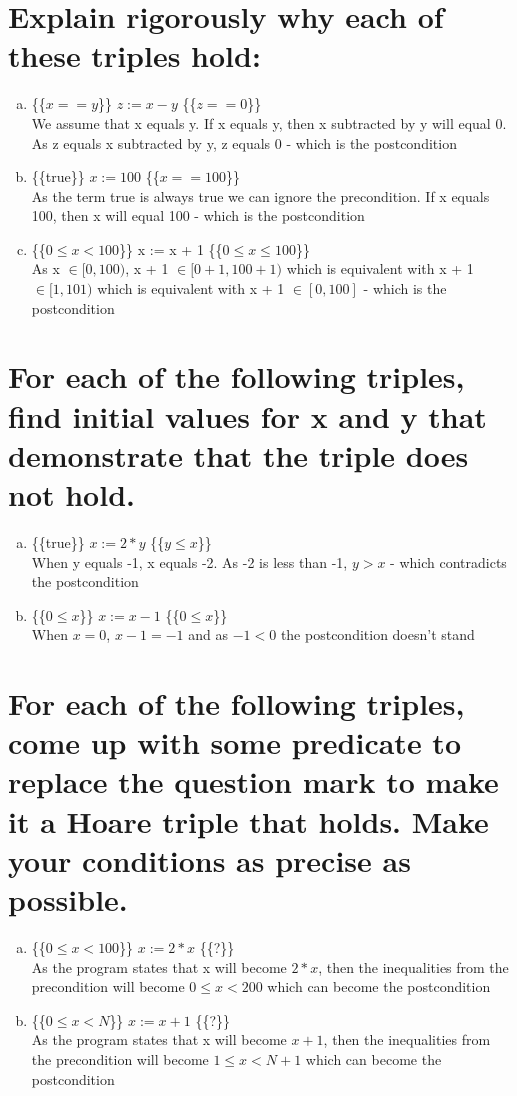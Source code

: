 \documentclass{article}
\begin{document}
\section{Explain rigorously why each of these triples hold:}

\begin{enumerate}[(a)]
	\item \{\{$x == y$\}\} $z := x - y$ \{\{$z == 0$\}\}
	      \\ We assume that x equals y. If x equals y, then x subtracted by y will equal 0. As z equals
	      x subtracted by y, z equals 0 - which is the postcondition
	\item \{\{true\}\} $x := 100$ \{\{$x == 100$\}\}
	      \\ As the term true is always true we can ignore the precondition. If x equals 100, then
	      x will equal 100 - which is the postcondition
	\item \{\{$0 \le x < 100$\}\} x := x + 1 \{\{$0 \le x \le 100$\}\}
	      \\ As x $\in [0, 100)$, x + 1 $\in [0 + 1, 100 + 1)$ which is equivalent with
	      x + 1 $\in [1, 101)$ which is equivalent with x + 1 $\in [0, 100]$ - which is the
	      postcondition
\end{enumerate}

\section{For each of the following triples, find initial values for x and y that demonstrate that the
  triple does not hold.}
\begin{enumerate}[(a)]
	\item \{\{true\}\} $x := 2 * y$ \{\{$y \le x$\}\}
	      \\ When y equals -1, x equals -2. As -2 is less than -1, $y > x$ - which contradicts the
	      postcondition
	\item \{\{$0 \le x$\}\} $x := x - 1$ \{\{$0 \le x$\}\}
	      \\ When $x = 0$, $x - 1 = -1$ and as $-1 < 0$ the postcondition doesn't stand
\end{enumerate}

\section{For each of the following triples, come up with some predicate to replace the question mark
  to make it a Hoare triple that holds. Make your conditions as precise as possible.}
\begin{enumerate}[(a)]
	\item \{\{$0 \le x < 100$\}\} $x := 2 * x$ \{\{?\}\}
	      \\ As the program states that x will become $2 * x$, then the inequalities from the precondition
	      will become $0 \le x < 200$ which can become the postcondition
	\item \{\{$0 \le x < N$\}\} $x := x + 1$ \{\{?\}\}
	      \\ As the program states that x will become $x + 1$, then the inequalities from the precondition
	      will become $1 \le x < N + 1$ which can become the postcondition
\end{enumerate}
\end{document}

